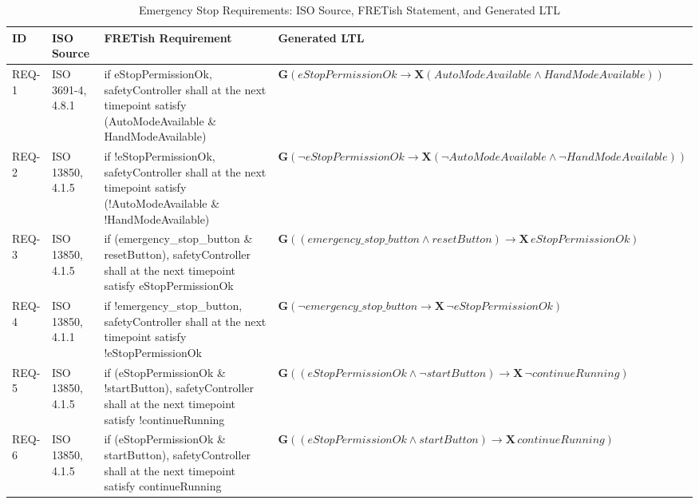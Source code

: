 \documentclass{ieeeaccess}
\theoremstyle{definition}
\newcommand{\G}{\mathbf{G}}
\newcommand{\X}{\mathbf{X}}
\begin{document}
\begin{table}[t]
\centering
\caption{Emergency Stop Requirements: ISO Source, FRETish Statement, and Generated LTL}
\label{tab:fretishLTL}
\small
\begin{tabular}{P{0.05\textwidth} P{0.09\textwidth} P{0.36\textwidth} P{0.38\textwidth}}
\toprule
\textbf{ID} & \textbf{ISO Source} & \textbf{FRETish Requirement} & \textbf{Generated LTL} \\
\midrule
REQ-1 & ISO 3691-4, 4.8.1 & if eStopPermissionOk, safetyController shall at the next timepoint satisfy (AutoModeAvailable \& HandModeAvailable) & $\G(\mathit{eStopPermissionOk} \rightarrow \X(\mathit{AutoModeAvailable} \wedge \mathit{HandModeAvailable}))$ \\
\midrule
REQ-2 & ISO 13850, 4.1.5 & if !eStopPermissionOk, safetyController shall at the next timepoint satisfy (!AutoModeAvailable \& !HandModeAvailable) & $\G(\neg \mathit{eStopPermissionOk} \rightarrow \X(\neg \mathit{AutoModeAvailable} \wedge \neg \mathit{HandModeAvailable}))$ \\
\midrule
REQ-3 & ISO 13850, 4.1.5 & if (emergency\_stop\_button \& resetButton), safetyController shall at the next timepoint satisfy eStopPermissionOk & $\G((\mathit{emergency\_stop\_button} \wedge \mathit{resetButton}) \rightarrow \X\,\mathit{eStopPermissionOk})$ \\
\midrule
REQ-4 & ISO 13850, 4.1.1 & if !emergency\_stop\_button, safetyController shall at the next timepoint satisfy !eStopPermissionOk & $\G(\neg \mathit{emergency\_stop\_button} \rightarrow \X\,\neg \mathit{eStopPermissionOk})$ \\
\midrule
REQ-5 & ISO 13850, 4.1.5 & if (eStopPermissionOk \& !startButton), safetyController shall at the next timepoint satisfy !continueRunning & $\G((\mathit{eStopPermissionOk} \wedge \neg \mathit{startButton}) \rightarrow \X\,\neg \mathit{continueRunning})$ \\
\midrule
REQ-6 & ISO 13850, 4.1.5 & if (eStopPermissionOk \& startButton), safetyController shall at the next timepoint satisfy continueRunning & $\G((\mathit{eStopPermissionOk} \wedge \mathit{startButton}) \rightarrow \X\,\mathit{continueRunning})$ \\
\bottomrule
\end{tabular}
\end{table}
\end{document}
